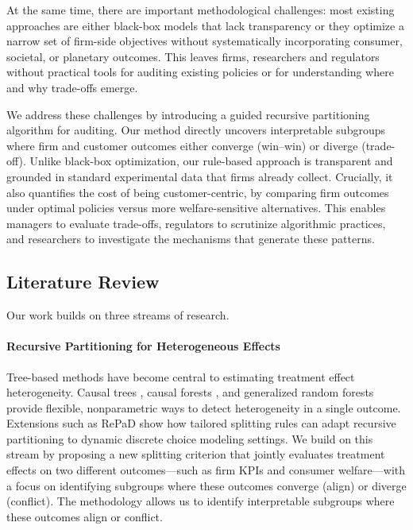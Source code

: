 \documentclass[11pt,letterpaper,english]{article}
\begin{document}
At the same time, there are important methodological challenges: most existing approaches are either black-box models that lack transparency or they optimize a narrow set of firm-side objectives without systematically incorporating consumer, societal, or planetary outcomes. This leaves firms, researchers and regulators without practical tools for auditing existing policies or for understanding where and why trade-offs emerge.

We address these challenges by introducing a guided recursive partitioning algorithm for auditing. Our method directly uncovers interpretable subgroups where firm and customer outcomes either converge (win–win) or diverge (trade-off). Unlike black-box optimization, our rule-based approach is transparent and grounded in standard experimental data that firms already collect. Crucially, it also quantifies the cost of being customer-centric, by comparing firm outcomes under optimal policies versus more welfare-sensitive alternatives. This enables managers to evaluate trade-offs, regulators to scrutinize algorithmic practices, and researchers to investigate the mechanisms that generate these patterns.

\subsection{Literature Review}

Our work builds on three streams of research.

\paragraph{Recursive Partitioning for Heterogeneous Effects} 

Tree-based methods have become central to estimating treatment effect heterogeneity. Causal trees \citep{athey2016recursive}, causal forests \citep{wager2018estimation}, and generalized random forests \citep{athey2019grf} provide flexible, nonparametric ways to detect heterogeneity in a single outcome. Extensions such as RePaD \citep{barzegary2022recursive} show how tailored splitting rules can adapt recursive partitioning to dynamic discrete choice modeling settings. We build on this stream by proposing a new splitting criterion that jointly evaluates treatment effects on two different outcomes—such as firm KPIs and consumer welfare—with a focus on identifying subgroups where these outcomes converge (align) or diverge (conflict). The methodology allows us to identify interpretable subgroups where these outcomes align or conflict.
\end{document}

